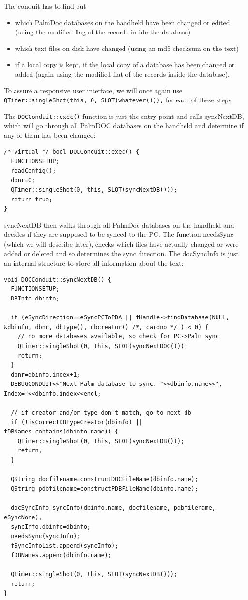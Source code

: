 \documentclass[10pt,a4paper]{article}
\newcommand{\code}[1]{{\small\texttt{#1}}}
\begin{document}
The conduit has to find out 
\begin{itemize}
\item which PalmDoc databases on the handheld have been changed or edited (using the modified flag of the records inside the database)
\item which text files on disk have changed (using an md5 checksum on the text)
\item if a local copy is kept, if the local copy of a database has been changed or added (again using the modified flat of the records inside the database).
\end{itemize}

To assure a responsive user interface, we will once again use \texttt{QTimer::singleShot(this, 0, SLOT(whatever()));} for each of these steps.

The \code{DOCConduit::exec()} function is just the entry point and calls syncNextDB, which will go through all PalmDOC databases on the handheld and determine if any of them has been changed:

{\footnotesize
\begin{verbatim}
/* virtual */ bool DOCConduit::exec() {
  FUNCTIONSETUP;
  readConfig();
  dbnr=0;
  QTimer::singleShot(0, this, SLOT(syncNextDB()));
  return true;
}
\end{verbatim}
}



syncNextDB then walks through all PalmDoc databases on the handheld and decides if they are supposed to be synced to the PC. The function needsSync (which we will describe later), checks which files have actually changed or were added or deleted and so determines the sync direction. The docSyncInfo is just an internal structure to store all information about the text:

{\footnotesize
\begin{verbatim}
void DOCConduit::syncNextDB() {
  FUNCTIONSETUP;
  DBInfo dbinfo;

  if (eSyncDirection==eSyncPCToPDA || fHandle->findDatabase(NULL, &dbinfo, dbnr, dbtype(), dbcreator() /*, cardno */ ) < 0) {
    // no more databases available, so check for PC->Palm sync
    QTimer::singleShot(0, this, SLOT(syncNextDOC()));
    return;
  }
  dbnr=dbinfo.index+1;
  DEBUGCONDUIT<<"Next Palm database to sync: "<<dbinfo.name<<", Index="<<dbinfo.index<<endl;

  // if creator and/or type don't match, go to next db
  if (!isCorrectDBTypeCreator(dbinfo) || fDBNames.contains(dbinfo.name)) {
    QTimer::singleShot(0, this, SLOT(syncNextDB()));
    return;
  }

  QString docfilename=constructDOCFileName(dbinfo.name);
  QString pdbfilename=constructPDBFileName(dbinfo.name);

  docSyncInfo syncInfo(dbinfo.name, docfilename, pdbfilename, eSyncNone);
  syncInfo.dbinfo=dbinfo;
  needsSync(syncInfo);
  fSyncInfoList.append(syncInfo);
  fDBNames.append(dbinfo.name);
  
  QTimer::singleShot(0, this, SLOT(syncNextDB()));
  return;
}
\end{verbatim}
}
\end{document}

